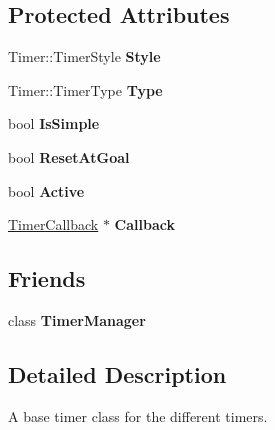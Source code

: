 \subsection*{Protected Attributes}
\begin{DoxyCompactItemize}
\item 
\hypertarget{classphys_1_1Timer_a4b0ece69e1df2bd7dd3c8001c279276a}{
Timer::TimerStyle {\bfseries Style}}
\label{d3/d83/classphys_1_1Timer_a4b0ece69e1df2bd7dd3c8001c279276a}

\item 
\hypertarget{classphys_1_1Timer_ac22ea3e7dfa49b2653d03b9579a04972}{
Timer::TimerType {\bfseries Type}}
\label{d3/d83/classphys_1_1Timer_ac22ea3e7dfa49b2653d03b9579a04972}

\item 
\hypertarget{classphys_1_1Timer_a3b2206e862a28209d72975d2c880aabd}{
bool {\bfseries IsSimple}}
\label{d3/d83/classphys_1_1Timer_a3b2206e862a28209d72975d2c880aabd}

\item 
\hypertarget{classphys_1_1Timer_a5a3508f2d43623da08ed2944e26063fd}{
bool {\bfseries ResetAtGoal}}
\label{d3/d83/classphys_1_1Timer_a5a3508f2d43623da08ed2944e26063fd}

\item 
\hypertarget{classphys_1_1Timer_a7336fd0658dfd6688bdd1d885b65c4b4}{
bool {\bfseries Active}}
\label{d3/d83/classphys_1_1Timer_a7336fd0658dfd6688bdd1d885b65c4b4}

\item 
\hypertarget{classphys_1_1Timer_aaaf41b293cd70432d1d3224fc4f6aaae}{
\hyperlink{classphys_1_1TimerCallback}{TimerCallback} $\ast$ {\bfseries Callback}}
\label{d3/d83/classphys_1_1Timer_aaaf41b293cd70432d1d3224fc4f6aaae}

\end{DoxyCompactItemize}
\subsection*{Friends}
\begin{DoxyCompactItemize}
\item 
\hypertarget{classphys_1_1Timer_a8f762e12639d620eb0f10068e6ab6521}{
class {\bfseries TimerManager}}
\label{d3/d83/classphys_1_1Timer_a8f762e12639d620eb0f10068e6ab6521}

\end{DoxyCompactItemize}


\subsection{Detailed Description}
A base timer class for the different timers. 

